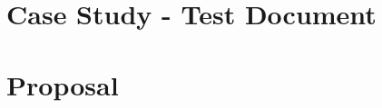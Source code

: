 \begin{appendices}
\clearpage



\cleardoublepage

\chapter{Case Study - Test Document}
\label{ch:survey-document}
\cleardoublepage



\chapter{Proposal}
\label{ch:proposal}
\cleardoublepage




\end{appendices}
